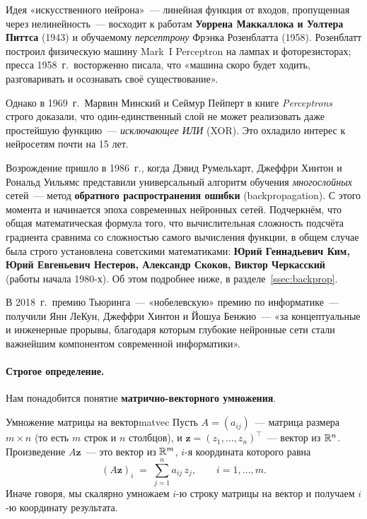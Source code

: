 \begin{historybox}
Идея «искусственного нейрона»~--- линейная функция от входов, пропущенная
через нелинейность~--- восходит к работам \textbf{Уоррена Маккаллока и
Уолтера Питтса} (1943) и обучаемому \emph{персептрону} Фрэнка Розенблатта
(1958). Розенблатт построил физическую машину Mark~I Perceptron на
лампах и фоторезисторах; пресса 1958~г.\ восторженно писала, что
«машина скоро будет ходить, разговаривать и осознавать своё
существование».

Однако в 1969~г.\ Марвин Минский и Сеймур Пейперт в книге
\emph{Perceptrons} строго доказали, что один-единственный слой не
может реализовать даже простейшую функцию~--- \emph{исключающее ИЛИ}
(XOR). Это охладило интерес к нейросетям почти на 15 лет.

Возрождение пришло в 1986~г., когда Дэвид Румельхарт, Джеффри Хинтон и
Рональд Уильямс представили универсальный алгоритм обучения
\emph{многослойных} сетей~--- метод \textbf{обратного распространения
ошибки} (backpropagation). С этого момента и начинается эпоха
современных нейронных сетей. Подчеркнём, что общая математическая
формула того, что вычислительная сложность подсчёта градиента
сравнима со сложностью самого вычисления функции, в общем случае была
строго установлена советскими математиками: \textbf{Юрий Геннадьевич
Ким, Юрий Евгеньевич Нестеров, Александр Скоков, Виктор Черкасский}
(работы начала 1980-х). Об этом подробнее ниже, в
разделе~\ref{ssec:backprop}.

В 2018~г.\ премию Тьюринга~--- «нобелевскую» премию по информатике~---
получили Янн ЛеКун, Джеффри Хинтон и Йошуа Бенжио~--- «за концептуальные
и инженерные прорывы, благодаря которым глубокие нейронные сети стали
важнейшим компонентом современной информатики».
\end{historybox}

\paragraph{Строгое определение.}
Нам понадобится понятие \textbf{матрично-векторного умножения}.

\begin{definition}{Умножение матрицы на вектор}{matvec}
Пусть $A=(a_{ij})$~--- матрица размера $m\times n$ (то есть $m$ строк и
$n$ столбцов), и $\mathbf z=(z_1,\dots,z_n)^{\top}$~--- вектор из $\mathbb{R}^{n}$.
Произведение $A\mathbf z$~--- это вектор из $\mathbb{R}^{m}$, $i$-я координата
которого равна
\begin{equation}\label{eq:matvec}
(A\mathbf z)_i\;=\;\sum_{j=1}^{n} a_{ij}\,z_j,\qquad i=1,\dots,m.
\end{equation}
Иначе говоря, мы скалярно умножаем $i$-ю строку матрицы на вектор и
получаем $i$-ю координату результата.
\end{definition}

